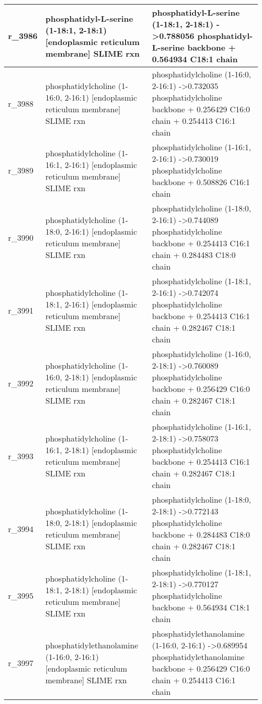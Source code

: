 \begin{landscape}
{\begin{longtable}{|l|p{7cm}|p{15cm}|}
r\_3986 & phosphatidyl-L-serine (1-18:1, 2-18:1) {[}endoplasmic reticulum membrane{]} SLIME rxn & phosphatidyl-L-serine (1-18:1, 2-18:1)  -\textgreater 0.788056 phosphatidyl-L-serine backbone + 0.564934 C18:1 chain \\ \hline
r\_3988 & phosphatidylcholine (1-16:0, 2-16:1) {[}endoplasmic reticulum membrane{]} SLIME rxn & phosphatidylcholine (1-16:0, 2-16:1)  -\textgreater 0.732035 phosphatidylcholine backbone + 0.256429 C16:0 chain + 0.254413 C16:1 chain \\ \hline
r\_3989 & phosphatidylcholine (1-16:1, 2-16:1) {[}endoplasmic reticulum membrane{]} SLIME rxn & phosphatidylcholine (1-16:1, 2-16:1)  -\textgreater 0.730019 phosphatidylcholine backbone + 0.508826 C16:1 chain \\ \hline
r\_3990 & phosphatidylcholine (1-18:0, 2-16:1) {[}endoplasmic reticulum membrane{]} SLIME rxn & phosphatidylcholine (1-18:0, 2-16:1)  -\textgreater 0.744089 phosphatidylcholine backbone + 0.254413 C16:1 chain + 0.284483 C18:0 chain \\ \hline
r\_3991 & phosphatidylcholine (1-18:1, 2-16:1) {[}endoplasmic reticulum membrane{]} SLIME rxn & phosphatidylcholine (1-18:1, 2-16:1)  -\textgreater 0.742074 phosphatidylcholine backbone + 0.254413 C16:1 chain + 0.282467 C18:1 chain \\ \hline
r\_3992 & phosphatidylcholine (1-16:0, 2-18:1) {[}endoplasmic reticulum membrane{]} SLIME rxn & phosphatidylcholine (1-16:0, 2-18:1)  -\textgreater 0.760089 phosphatidylcholine backbone + 0.256429 C16:0 chain + 0.282467 C18:1 chain \\ \hline
r\_3993 & phosphatidylcholine (1-16:1, 2-18:1) {[}endoplasmic reticulum membrane{]} SLIME rxn & phosphatidylcholine (1-16:1, 2-18:1)  -\textgreater 0.758073 phosphatidylcholine backbone + 0.254413 C16:1 chain + 0.282467 C18:1 chain \\ \hline
r\_3994 & phosphatidylcholine (1-18:0, 2-18:1) {[}endoplasmic reticulum membrane{]} SLIME rxn & phosphatidylcholine (1-18:0, 2-18:1)  -\textgreater 0.772143 phosphatidylcholine backbone + 0.284483 C18:0 chain + 0.282467 C18:1 chain \\ \hline
r\_3995 & phosphatidylcholine (1-18:1, 2-18:1) {[}endoplasmic reticulum membrane{]} SLIME rxn & phosphatidylcholine (1-18:1, 2-18:1)  -\textgreater 0.770127 phosphatidylcholine backbone + 0.564934 C18:1 chain \\ \hline
r\_3997 & phosphatidylethanolamine (1-16:0, 2-16:1) {[}endoplasmic reticulum membrane{]} SLIME rxn & phosphatidylethanolamine (1-16:0, 2-16:1)  -\textgreater 0.689954 phosphatidylethanolamine backbone + 0.256429 C16:0 chain + 0.254413 C16:1 chain \\ \hline

\end{longtable}}
\end{landscape}
